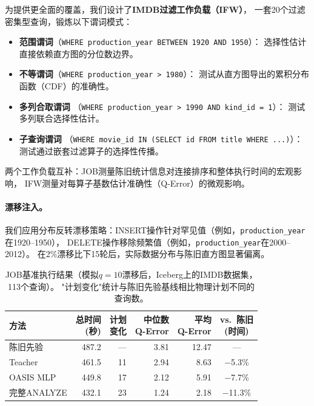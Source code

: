 \documentclass[runningheads]{llncs}
\begin{document}
为提供更全面的覆盖，我们设计了\textbf{IMDB过滤工作负载（IFW）}，
一套20个过滤密集型查询，锻炼以下谓词模式：
\begin{itemize}[leftmargin=*,nosep]
  \item \textbf{范围谓词}（\texttt{WHERE production\_year BETWEEN 1920 AND 1950}）：
        选择性估计直接依赖直方图的分位数边界。
  \item \textbf{不等谓词}（\texttt{WHERE production\_year > 1980}）：
        测试从直方图导出的累积分布函数（CDF）的准确性。
  \item \textbf{多列合取谓词}
        （\texttt{WHERE production\_year > 1990 AND kind\_id = 1}）：
        测试多列联合选择性估计。
  \item \textbf{子查询谓词}
        （\texttt{WHERE movie\_id IN (SELECT id FROM title WHERE ...)}）：
        测试通过嵌套过滤算子的选择性传播。
\end{itemize}
两个工作负载互补：JOB测量陈旧统计信息对连接排序和整体执行时间的宏观影响，
IFW测量对每算子基数估计准确性（Q-Error）的微观影响。

\paragraph{漂移注入。}
我们应用分布反转漂移策略：INSERT操作针对罕见值（例如，\texttt{production\_year}在1920–1950），
DELETE操作移除频繁值（例如，\texttt{production\_year}在2000–2012）。
在2\%漂移比下15轮后，实际数据分布与陈旧直方图显著偏离。

\begin{table}[t]
  \centering
  \caption{JOB基准执行结果（模拟$q{=}10$漂移后，Iceberg上的IMDB数据集，113个查询）。
           "计划变化"统计与陈旧先验基线相比物理计划不同的查询数。}
  \label{tab:job}
  \setlength{\tabcolsep}{3.5pt}
  \begin{tabular}{l rr rr c}
    \toprule
    方法 & \makecell{总时间\\(秒)} & \makecell{计划\\变化} & \makecell{中位数\\Q-Error} & \makecell{平均\\Q-Error} & \makecell{vs.\ 陈旧\\(时间)} \\
    \midrule
    陈旧先验    & 487.2 & —  & 3.81 & 12.47 & — \\
    Teacher        & 461.5 & 11 & 2.94 & 8.63  & $-$5.3\% \\
    OASIS MLP      & 449.8 & 17 & 2.12 & 5.91  & $-$7.7\% \\
    完整ANALYZE   & 432.1 & 23 & 1.24 & 2.18  & $-$11.3\% \\
    \bottomrule
  \end{tabular}
\end{table}
\end{document}
